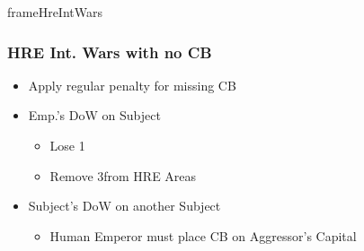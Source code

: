 \documentclass[10pt]{article}
\newlength{\fhHreIntWars} \setlength\fhHreIntWars{8\baselineskip}
\begin{document}
\begin{dynamiccontents*}{frameHreIntWars}\begin{eubox}{\fhHreIntWars}
	\subsubsection*{HRE Int. Wars with no CB }
	\begin{itemize}
		\item Apply regular \stability penalty for missing CB
		\item Emp.'s DoW on Subject
		\begin{itemize}
			\item Lose 1\authority
			\item Remove 3\influence from HRE Areas
		\end{itemize}
		\item Subject's DoW on another Subject
		\begin{itemize}
			\item Human Emperor must place CB on Aggressor's Capital
		\end{itemize}
	\end{itemize}
\end{eubox}\end{dynamiccontents*}
\end{document}
